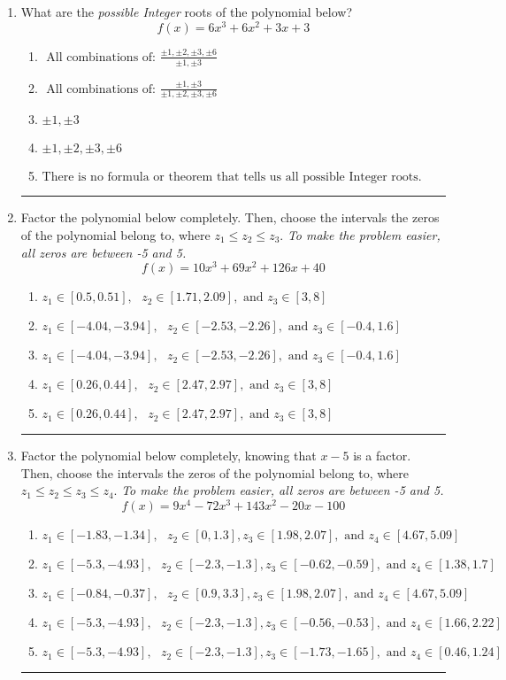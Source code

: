 \documentclass[14pt]{extbook}
\newcommand{\litem}[1]{\item#1\hspace*{-1cm}\rule{\textwidth}{0.4pt}}
\begin{document}
\begin{enumerate}
\litem{
What are the \textit{possible Integer} roots of the polynomial below?\[ f(x) = 6x^{3} +6 x^{2} +3 x + 3 \]\begin{enumerate}[label=\Alph*.]
\item \( \text{ All combinations of: }\frac{\pm 1,\pm 2,\pm 3,\pm 6}{\pm 1,\pm 3} \)
\item \( \text{ All combinations of: }\frac{\pm 1,\pm 3}{\pm 1,\pm 2,\pm 3,\pm 6} \)
\item \( \pm 1,\pm 3 \)
\item \( \pm 1,\pm 2,\pm 3,\pm 6 \)
\item \( \text{There is no formula or theorem that tells us all possible Integer roots.} \)

\end{enumerate} }
\litem{
Factor the polynomial below completely. Then, choose the intervals the zeros of the polynomial belong to, where $z_1 \leq z_2 \leq z_3$. \textit{To make the problem easier, all zeros are between -5 and 5.}\[ f(x) = 10x^{3} +69 x^{2} +126 x + 40 \]\begin{enumerate}[label=\Alph*.]
\item \( z_1 \in [0.5, 0.51], \text{   }  z_2 \in [1.71, 2.09], \text{   and   } z_3 \in [3, 8] \)
\item \( z_1 \in [-4.04, -3.94], \text{   }  z_2 \in [-2.53, -2.26], \text{   and   } z_3 \in [-0.4, 1.6] \)
\item \( z_1 \in [-4.04, -3.94], \text{   }  z_2 \in [-2.53, -2.26], \text{   and   } z_3 \in [-0.4, 1.6] \)
\item \( z_1 \in [0.26, 0.44], \text{   }  z_2 \in [2.47, 2.97], \text{   and   } z_3 \in [3, 8] \)
\item \( z_1 \in [0.26, 0.44], \text{   }  z_2 \in [2.47, 2.97], \text{   and   } z_3 \in [3, 8] \)

\end{enumerate} }
\litem{
Factor the polynomial below completely, knowing that $x -5$ is a factor. Then, choose the intervals the zeros of the polynomial belong to, where $z_1 \leq z_2 \leq z_3 \leq z_4$. \textit{To make the problem easier, all zeros are between -5 and 5.}\[ f(x) = 9x^{4} -72 x^{3} +143 x^{2} -20 x -100 \]\begin{enumerate}[label=\Alph*.]
\item \( z_1 \in [-1.83, -1.34], \text{   }  z_2 \in [0, 1.3], z_3 \in [1.98, 2.07], \text{   and   } z_4 \in [4.67, 5.09] \)
\item \( z_1 \in [-5.3, -4.93], \text{   }  z_2 \in [-2.3, -1.3], z_3 \in [-0.62, -0.59], \text{   and   } z_4 \in [1.38, 1.7] \)
\item \( z_1 \in [-0.84, -0.37], \text{   }  z_2 \in [0.9, 3.3], z_3 \in [1.98, 2.07], \text{   and   } z_4 \in [4.67, 5.09] \)
\item \( z_1 \in [-5.3, -4.93], \text{   }  z_2 \in [-2.3, -1.3], z_3 \in [-0.56, -0.53], \text{   and   } z_4 \in [1.66, 2.22] \)
\item \( z_1 \in [-5.3, -4.93], \text{   }  z_2 \in [-2.3, -1.3], z_3 \in [-1.73, -1.65], \text{   and   } z_4 \in [0.46, 1.24] \)


\end{enumerate}}
\end{enumerate}
\end{document}
